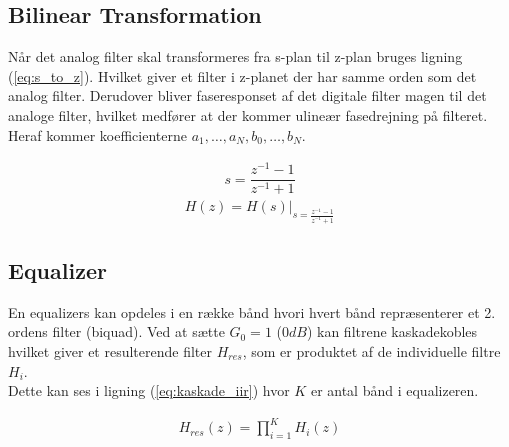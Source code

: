     \subsection{Bilinear Transformation}
    Når det analog filter skal transformeres fra s-plan til z-plan bruges ligning (\ref{eq:s_to_z}). Hvilket giver et 
    filter i z-planet der har samme orden som det analog filter. Derudover bliver faseresponset af det digitale filter magen til 
    det analoge filter, hvilket medfører at der kommer ulineær fasedrejning på filteret. 
    Heraf kommer koefficienterne $a_1, \dots, a_N, b_0,\dots, b_N $. 
  
    \begin{align}
    s = \dfrac{z^{-1} - 1}{z^{-1} + 1}  
    \label{eq:s_to_z}
    \end{align}
    \begin{align}
    H(z) = H(s)\big|_{s = \frac{z^{-1} - 1}{z^{-1}+ 1 }}
    \end{align}

    
   \subsection{Equalizer}

   En equalizers kan opdeles i en række bånd hvori hvert bånd repræsenterer et 
   2. ordens filter (biquad). Ved at sætte $G_0 = 1$ ($0 dB$) kan filtrene kaskadekobles hvilket giver 
   et resulterende filter $H_{res}$, som er produktet af de individuelle filtre $H_i$. \\
   Dette kan ses i ligning (\ref{eq:kaskade_iir}) hvor $K$ er antal bånd i equalizeren.  

   \begin{align}
    H_{res}(z) = \prod_{i=1}^{K} H_i(z)
    \label{eq:kaskade_iir}
   \end{align} 




 






